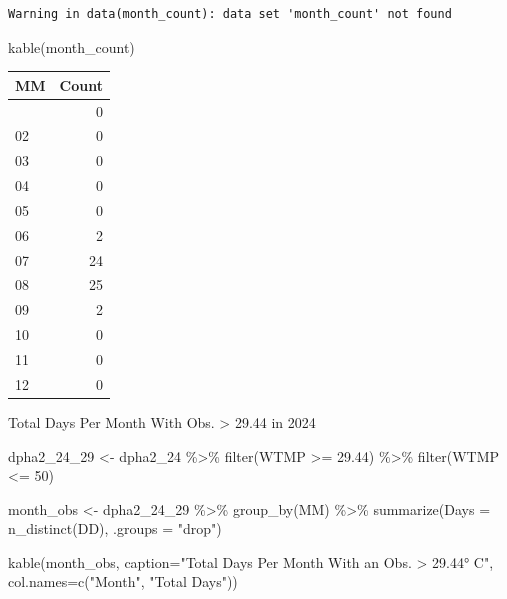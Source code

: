 \documentclass[
  letterpaper,
  DIV=11,
  numbers=noendperiod]{scrreprt}
\newenvironment{Shaded}{\begin{snugshade}}{\end{snugshade}}
\newcommand{\AttributeTok}[1]{\textcolor[rgb]{0.40,0.45,0.13}{#1}}
\newcommand{\DecValTok}[1]{\textcolor[rgb]{0.68,0.00,0.00}{#1}}
\newcommand{\FloatTok}[1]{\textcolor[rgb]{0.68,0.00,0.00}{#1}}
\newcommand{\FunctionTok}[1]{\textcolor[rgb]{0.28,0.35,0.67}{#1}}
\newcommand{\NormalTok}[1]{\textcolor[rgb]{0.00,0.23,0.31}{#1}}
\newcommand{\OtherTok}[1]{\textcolor[rgb]{0.00,0.23,0.31}{#1}}
\newcommand{\SpecialCharTok}[1]{\textcolor[rgb]{0.37,0.37,0.37}{#1}}
\newcommand{\StringTok}[1]{\textcolor[rgb]{0.13,0.47,0.30}{#1}}
\begin{document}
\begin{verbatim}
Warning in data(month_count): data set 'month_count' not found
\end{verbatim}

\begin{Shaded}
\begin{Highlighting}[]
\FunctionTok{kable}\NormalTok{(month\_count)}
\end{Highlighting}
\end{Shaded}

\begin{longtable}[]{@{}lr@{}}
\toprule\noalign{}
MM & Count \\
\midrule\noalign{}
\endhead
\bottomrule\noalign{}
\endlastfoot
01 & 0 \\
02 & 0 \\
03 & 0 \\
04 & 0 \\
05 & 0 \\
06 & 2 \\
07 & 24 \\
08 & 25 \\
09 & 2 \\
10 & 0 \\
11 & 0 \\
12 & 0 \\
\end{longtable}

Total Days Per Month With Obs. \textgreater{} 29.44 in 2024

\begin{Shaded}
\begin{Highlighting}[]
\NormalTok{dpha2\_24\_29 }\OtherTok{\textless{}{-}}\NormalTok{ dpha2\_24 }\SpecialCharTok{\%\textgreater{}\%}
  \FunctionTok{filter}\NormalTok{(WTMP }\SpecialCharTok{\textgreater{}=} \FloatTok{29.44}\NormalTok{) }\SpecialCharTok{\%\textgreater{}\%}
  \FunctionTok{filter}\NormalTok{(WTMP }\SpecialCharTok{\textless{}=} \DecValTok{50}\NormalTok{)}

\NormalTok{month\_obs }\OtherTok{\textless{}{-}}\NormalTok{ dpha2\_24\_29 }\SpecialCharTok{\%\textgreater{}\%}
  \FunctionTok{group\_by}\NormalTok{(MM) }\SpecialCharTok{\%\textgreater{}\%}
  \FunctionTok{summarize}\NormalTok{(}\AttributeTok{Days =} \FunctionTok{n\_distinct}\NormalTok{(DD), }\AttributeTok{.groups =} \StringTok{"drop"}\NormalTok{)}

\FunctionTok{kable}\NormalTok{(month\_obs, }\AttributeTok{caption=}\StringTok{"Total Days Per Month With an Obs. \textgreater{} 29.44° C"}\NormalTok{, }\AttributeTok{col.names=}\FunctionTok{c}\NormalTok{(}\StringTok{"Month"}\NormalTok{, }\StringTok{"Total Days"}\NormalTok{))}
\end{Highlighting}
\end{Shaded}
\end{document}
